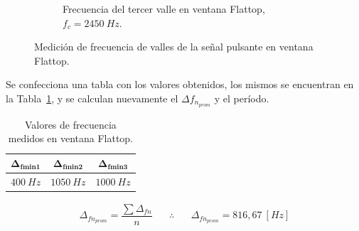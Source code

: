 \begin{figure}[H]
        \hfill
        \begin{subfigure}[H]{0.48\textwidth}
          \caption{Frecuencia del tercer valle en ventana Flattop, $f_{c}=2450~Hz$.}
        \end{subfigure}

        \caption{Medición de frecuencia de valles de la señal pulsante en ventana Flattop.}
        \label{fig:Exp2SeñalPulsanteVallesEspectro}
      \end{figure}     

      Se confecciona una tabla con los valores obtenidos, los mismos se encuentran en la 
      Tabla~\ref{tab:Exp2MedicionesFlattop}, y se calculan nuevamente el $\Delta f_{n_{prom}}$
      y el período. 

      \begin{table}[H]
      \centering
        \begin{tabular}{ccc} \hline \hline
          $\mathbf{\Delta_{fmin1}}$               &  $\mathbf{\Delta_{fmin2}}$       & $\mathbf{\Delta_{fmin3}}$ \\ \hline
                    $400~Hz$                        &    $1050~Hz$                    &   $1000~Hz$  \\ \hline \hline
         \end{tabular}
          \caption{Valores de frecuencia medidos en ventana Flattop.}
          \label{tab:Exp2MedicionesFlattop}
      \end{table}  

      \begin{align*}
        \Delta_{fn_{prom}}=\dfrac{\sum{\Delta_{fn}}}{n} \hspace{20pt} \therefore \hspace{20pt} \boxed{\Delta_{fn_{prom}}=816,67~[Hz]}
      \end{align*}        

